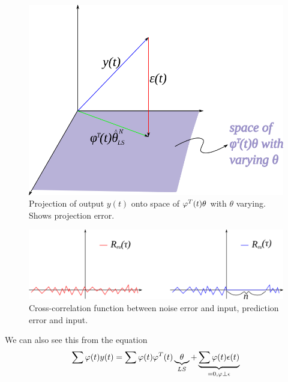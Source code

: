 \documentclass[lecture,12pt,]{pcms-l}
\begin{document}
\begin{figure}[ht!]
  \centering
  \includegraphics[width=.5\textwidth]{images/mt062d2}
  \caption{Projection of output $y(t)$ onto space of $\varphi^T(t)\theta$ with $\theta$ varying. Shows projection error.}
  \label{fig:mt062d2}
\end{figure}

\begin{figure}[ht!]
  \centering
  \includegraphics[width=.5\textwidth]{images/mt062d1}
  \caption{Cross-correlation function between noise error and input, prediction error and input.}
  \label{fig:mt062d1}
\end{figure}

We can also see this from the equation
$$\sum\varphi(t)y(t) = \sum\varphi(t)\varphi^T(t)\underbrace{\theta}_{LS} + \underbrace{\sum\varphi(t)\epsilon(t)}_{=0, \varphi\perp\epsilon}$$
\end{document}
